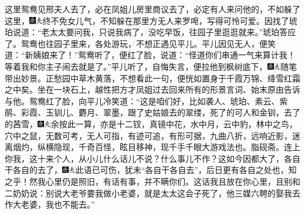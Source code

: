 这里鸳鸯见邢夫人去了，必在凤姐儿房里商议去了，必定有人来问他的，不如躲了这里，{\includegraphics[width=3mm]{../Images/00004}\includegraphics[width=3mm]{../Images/00012}\footnotesize \kaishu 终不免女儿气，不知躲在那里方无人来罗唣，写得可怜可爱。}因找了琥珀说道：``老太太要问我，只说我病了，没吃早饭，往园子里逛逛就来。''琥珀答应了。鸳鸯也往园子里来，各处游玩，不想正遇见平儿。平儿因见无人，便笑道：``新姨娘来了！''鸳鸯听了，便红了脸，说道：``怪道你们串通一气来算计我！等着我和你主子闹去就是了。''平儿听了，自悔失言，便拉他到枫树底下，{\includegraphics[width=3mm]{../Images/00004}\includegraphics[width=3mm]{../Images/00012}\footnotesize \kaishu 随笔带出妙景。正愁园中草木黄落，不想看此一句，便恍如置身于千霞万锦、绛雪红霜之中矣。}坐在一块石上，越性把方才凤姐过去回来所有的形景言词、始末原由告诉与他。鸳鸯红了脸，向平儿冷笑道：``这是咱们好，比如袭人、琥珀、素云、紫鹃、彩霞、玉钏儿、麝月、翠墨，跟了史姑娘去的翠缕，死了的可人和金钏，去了的茜雪，{\includegraphics[width=3mm]{../Images/00004}\includegraphics[width=3mm]{../Images/00012}\footnotesize \kaishu 余按此一算，亦是十二钗，真镜中花，水中月，云中豹，林中之鸟，穴中之鼠，无数可考，无人可指，有迹可追，有形可据，九曲八折，远响近影，迷离烟灼，纵横隐现，千奇百怪，眩目移神，现千手千眼大游戏法也。脂砚斋。}连上你我，这十来个人，从小儿什么话儿不说？什么事儿不作？这如今因都大了，各自干各自的去了，{\includegraphics[width=3mm]{../Images/00004}\includegraphics[width=3mm]{../Images/00012}\footnotesize \kaishu 此语已可伤，犹未``各自干各自去''，后日更有各自之处也，知之乎！}然我心里仍是照旧，有话有事，并不瞒你们。这话我且放在你心里，且别和二奶奶说：别说大老爷要我做小老婆，就是太太这会子死了，他三媒六聘的娶我去作大老婆，我也不能去。''

